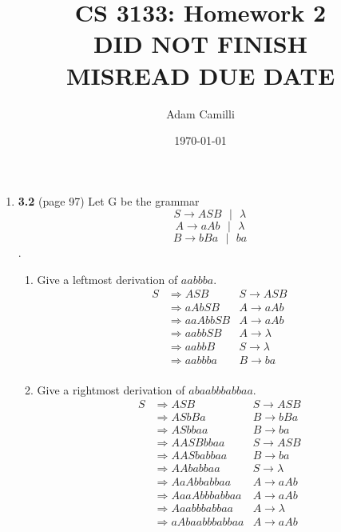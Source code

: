 \documentclass[12pt]{article}
\begin{document}
\title{CS 3133: Homework 2 \\ DID NOT FINISH \\ MISREAD DUE DATE}
\author{Adam Camilli}
\date{\today}
\maketitle

\begin{enumerate}
  \item \textbf{3.2} (page 97) Let G be the grammar
    \[ S \rightarrow ASB \textrm{ } | \textrm{ } \lambda \]
    \[A \rightarrow aAb \textrm{ } | \textrm{ } \lambda \]
    \[B  \rightarrow bBa \textrm{ } | \textrm{ } ba \].
    \begin{enumerate}
      \item Give a leftmost derivation of $aabbba$.
        \begin{align*}
          S &\Rightarrow ASB &S \rightarrow ASB \\
            &\Rightarrow aAbSB &A \rightarrow aAb \\
            &\Rightarrow aaAbbSB &A \rightarrow aAb \\
            &\Rightarrow aabbSB &A \rightarrow \lambda \\
            &\Rightarrow aabbB &S \rightarrow \lambda \\
            &\Rightarrow aabbba &B \rightarrow ba \\
        \end{align*}
      \item Give a rightmost derivation of $abaabbbabbaa$.
        \begin{align*}
          S &\Rightarrow ASB &S \rightarrow ASB \\
            &\Rightarrow ASbBa &B \rightarrow bBa \\
            &\Rightarrow ASbbaa &B \rightarrow ba \\
            &\Rightarrow AASBbbaa &S \rightarrow ASB \\
            &\Rightarrow AASbabbaa &B \rightarrow ba \\
            &\Rightarrow AAbabbaa &S \rightarrow \lambda \\
            &\Rightarrow AaAbbabbaa &A \rightarrow aAb \\
            &\Rightarrow AaaAbbbabbaa &A \rightarrow aAb \\
            &\Rightarrow Aaabbbabbaa &A \rightarrow \lambda \\
            &\Rightarrow aAbaabbbabbaa &A \rightarrow aAb \\

\end{align*}
\end{enumerate}
\end{enumerate}
\end{document}
